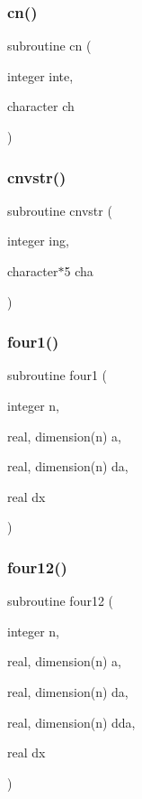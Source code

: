 \subsubsection{\texorpdfstring{cn()}{cn()}}
{\footnotesize\ttfamily subroutine cn (\begin{DoxyParamCaption}\item[{integer}]{inte,  }\item[{character}]{ch }\end{DoxyParamCaption})}

\mbox{\label{sfft_8f_a793beaf15d43aba14940d2e3dc11ba2b}} 
\subsubsection{\texorpdfstring{cnvstr()}{cnvstr()}}
{\footnotesize\ttfamily subroutine cnvstr (\begin{DoxyParamCaption}\item[{integer}]{ing,  }\item[{character$\ast$5}]{cha }\end{DoxyParamCaption})}

\mbox{\label{sfft_8f_a3274082ab31b5f843d75b9e8e1e654e6}} 
\subsubsection{\texorpdfstring{four1()}{four1()}}
{\footnotesize\ttfamily subroutine four1 (\begin{DoxyParamCaption}\item[{integer}]{n,  }\item[{real, dimension(n)}]{a,  }\item[{real, dimension(n)}]{da,  }\item[{real}]{dx }\end{DoxyParamCaption})}

\mbox{\label{sfft_8f_ac1d50a4cb97554dc32c9c293a8ec3558}} 
\subsubsection{\texorpdfstring{four12()}{four12()}}
{\footnotesize\ttfamily subroutine four12 (\begin{DoxyParamCaption}\item[{integer}]{n,  }\item[{real, dimension(n)}]{a,  }\item[{real, dimension(n)}]{da,  }\item[{real, dimension(n)}]{dda,  }\item[{real}]{dx }\end{DoxyParamCaption})}

